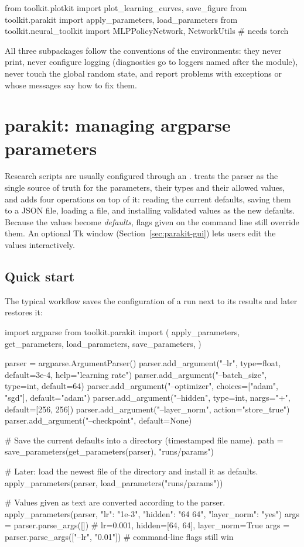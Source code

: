 \begin{pycode}
from toolkit.plotkit import plot_learning_curves, save_figure
from toolkit.parakit import apply_parameters, load_parameters
from toolkit.neural_toolkit import MLPPolicyNetwork, NetworkUtils  # needs torch
\end{pycode}

All three subpackages follow the conventions of the environments: they never
print, never configure logging (diagnostics go to  loggers named
after the module), never touch the global random state, and report problems
with exceptions or  whose messages say how to fix them.

\section{parakit: managing argparse parameters}\label{sec:parakit}

Research scripts are usually configured through an
.  treats the parser as the single
source of truth for the parameters, their types and their allowed values, and
adds four operations on top of it: reading the current defaults, saving them
to a JSON file, loading a file, and installing validated values as the new
defaults. Because the values become \emph{defaults}, flags given on the
command line still override them. An optional Tk window
(Section~\ref{sec:parakit-gui}) lets users edit the values interactively.

\subsection{Quick start}\label{sec:parakit-quickstart}

The typical workflow saves the configuration of a run next to its results and
later restores it:

\begin{pycode}
import argparse
from toolkit.parakit import (
    apply_parameters, get_parameters, load_parameters, save_parameters,
)

parser = argparse.ArgumentParser()
parser.add_argument("--lr", type=float, default=3e-4, help="learning rate")
parser.add_argument("--batch_size", type=int, default=64)
parser.add_argument("--optimizer", choices=["adam", "sgd"], default="adam")
parser.add_argument("--hidden", type=int, nargs="+", default=[256, 256])
parser.add_argument("--layer_norm", action="store_true")
parser.add_argument("--checkpoint", default=None)

# Save the current defaults into a directory (timestamped file name).
path = save_parameters(get_parameters(parser), "runs/params")

# Later: load the newest file of the directory and install it as defaults.
apply_parameters(parser, load_parameters("runs/params"))

# Values given as text are converted according to the parser.
apply_parameters(parser, {"lr": "1e-3", "hidden": "64 64", "layer_norm": "yes"})
args = parser.parse_args([])            # lr=0.001, hidden=[64, 64], layer_norm=True
args = parser.parse_args(["--lr", "0.01"])  # command-line flags still win
\end{pycode}

